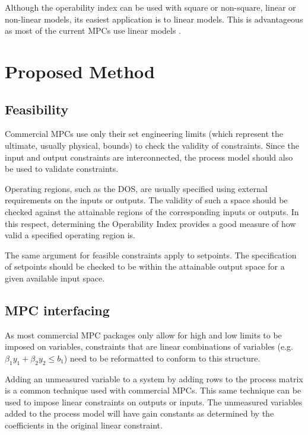 \documentclass[final,authoryear,5pt,times,twocolumn]{elsarticle}
\begin{document}
Although the operability index can be used with square or non-square, linear or non-linear models, its easiest application is to linear models. 
This is advantageous as most of the current MPCs use linear models \citep{vinsonphd}.


\section{Proposed Method}\label{sec:method}

\subsection{Feasibility}\label{sec:feasibility}
Commercial MPCs use only their set engineering limits (which represent the ultimate, usually physical, bounds) to check the validity of constraints.
Since the input and output constraints are interconnected, the process model should also be used to validate constraints.

Operating regions, such as the DOS, are usually specified using external requirements on the inputs or outputs.
The validity of such a space should be checked against the attainable regions of the corresponding inputs or outputs.
In this respect, determining the Operability Index provides a good measure of how valid a specified operating region is.

The same argument for feasible constraints apply to setpoints.
The specification of setpoints should be checked to be within the attainable output space for a given available input space.

\subsection{MPC interfacing}\label{sec:lincons}
As most commercial MPC packages only allow for high and low limits to be imposed on variables, constraints that are linear combinations of variables (e.g. $\beta_1 y_1+\beta_2 y_2\leq b_1$) need to be reformatted to conform to this structure.

Adding an unmeasured variable to a system by adding rows to the process matrix is a common technique used with commercial MPCs.
This same technique can be used to impose linear constraints on outputs or inputs.
The unmeasured variables added to the process model will have gain constants as determined by the coefficients in the original linear constraint.
\end{document}
